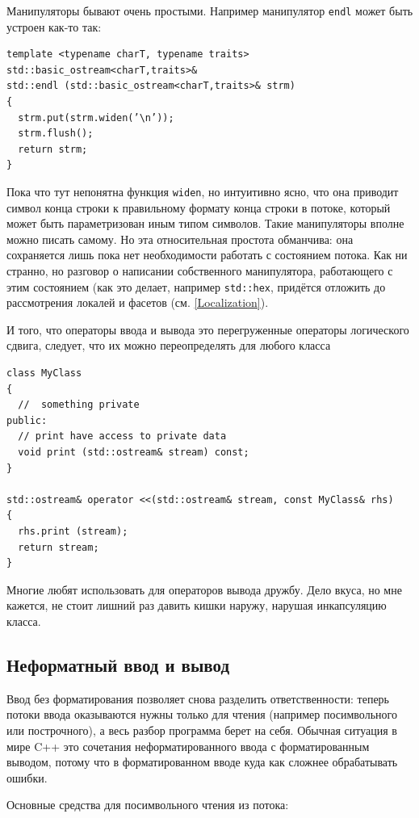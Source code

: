 \documentclass[a4paper,12pt,oneside]{book}
\begin{document}
Манипуляторы бывают очень простыми. Например манипулятор \lstinline!endl! может быть устроен как-то так:

\begin{lstlisting}
template <typename charT, typename traits>
std::basic_ostream<charT,traits>&
std::endl (std::basic_ostream<charT,traits>& strm)
{
  strm.put(strm.widen(’\n’));
  strm.flush();
  return strm;
}
\end{lstlisting}

Пока что тут непонятна функция \lstinline!widen!, но интуитивно ясно, что она приводит символ конца строки к правильному формату конца строки в потоке, который может быть параметризован иным типом символов. Такие манипуляторы вполне можно писать самому. Но эта относительная простота обманчива: она сохраняется лишь пока нет необходимости работать с состоянием потока. Как ни странно, но разговор о написании собственного манипулятора, работающего с этим состоянием (как это делает, например \lstinline!std::hex!, придётся отложить до рассмотрения локалей и фасетов (см. \ref{Localization}).

И того, что операторы ввода и вывода это перегруженные операторы логического сдвига, следует, что их можно переопределять для любого класса

\begin{lstlisting}
class MyClass
{
  //  something private
public:
  // print have access to private data
  void print (std::ostream& stream) const; 
}

std::ostream& operator <<(std::ostream& stream, const MyClass& rhs) 
{
  rhs.print (stream);
  return stream;
}
\end{lstlisting}

Многие любят использовать для операторов вывода дружбу. Дело вкуса, но мне кажется, не стоит лишний раз давить кишки наружу, нарушая инкапсуляцию класса.

\subsection{Неформатный ввод и вывод}

Ввод без форматирования позволяет снова разделить ответственности: теперь потоки ввода оказываются нужны только для чтения (например посимвольного или построчного), а весь разбор программа берет на себя. Обычная ситуация в мире C++ это сочетания неформатированного ввода с форматированным выводом, потому что в форматированном вводе куда как сложнее обрабатывать ошибки.

Основные средства для посимвольного чтения из потока: 
\end{document}
